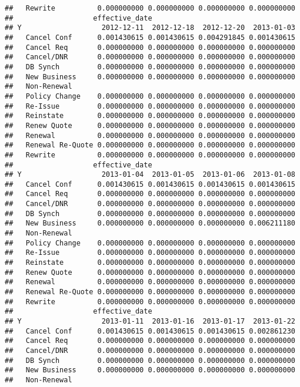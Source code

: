 \documentclass[]{article}
\begin{document}
\begin{verbatim}
##   Rewrite          0.000000000 0.000000000 0.000000000 0.000000000
##                   effective_date
## Y                   2012-12-11  2012-12-18  2012-12-20  2013-01-03
##   Cancel Conf      0.001430615 0.001430615 0.004291845 0.001430615
##   Cancel Req       0.000000000 0.000000000 0.000000000 0.000000000
##   Cancel/DNR       0.000000000 0.000000000 0.000000000 0.000000000
##   DB Synch         0.000000000 0.000000000 0.000000000 0.000000000
##   New Business     0.000000000 0.000000000 0.000000000 0.000000000
##   Non-Renewal                                                     
##   Policy Change    0.000000000 0.000000000 0.000000000 0.000000000
##   Re-Issue         0.000000000 0.000000000 0.000000000 0.000000000
##   Reinstate        0.000000000 0.000000000 0.000000000 0.000000000
##   Renew Quote      0.000000000 0.000000000 0.000000000 0.000000000
##   Renewal          0.000000000 0.000000000 0.000000000 0.000000000
##   Renewal Re-Quote 0.000000000 0.000000000 0.000000000 0.000000000
##   Rewrite          0.000000000 0.000000000 0.000000000 0.000000000
##                   effective_date
## Y                   2013-01-04  2013-01-05  2013-01-06  2013-01-08
##   Cancel Conf      0.001430615 0.001430615 0.001430615 0.001430615
##   Cancel Req       0.000000000 0.000000000 0.000000000 0.000000000
##   Cancel/DNR       0.000000000 0.000000000 0.000000000 0.000000000
##   DB Synch         0.000000000 0.000000000 0.000000000 0.000000000
##   New Business     0.000000000 0.000000000 0.000000000 0.006211180
##   Non-Renewal                                                     
##   Policy Change    0.000000000 0.000000000 0.000000000 0.000000000
##   Re-Issue         0.000000000 0.000000000 0.000000000 0.000000000
##   Reinstate        0.000000000 0.000000000 0.000000000 0.000000000
##   Renew Quote      0.000000000 0.000000000 0.000000000 0.000000000
##   Renewal          0.000000000 0.000000000 0.000000000 0.000000000
##   Renewal Re-Quote 0.000000000 0.000000000 0.000000000 0.000000000
##   Rewrite          0.000000000 0.000000000 0.000000000 0.000000000
##                   effective_date
## Y                   2013-01-11  2013-01-16  2013-01-17  2013-01-22
##   Cancel Conf      0.001430615 0.001430615 0.001430615 0.002861230
##   Cancel Req       0.000000000 0.000000000 0.000000000 0.000000000
##   Cancel/DNR       0.000000000 0.000000000 0.000000000 0.000000000
##   DB Synch         0.000000000 0.000000000 0.000000000 0.000000000
##   New Business     0.000000000 0.000000000 0.000000000 0.000000000
##   Non-Renewal                                                     

\end{verbatim}
\end{document}

